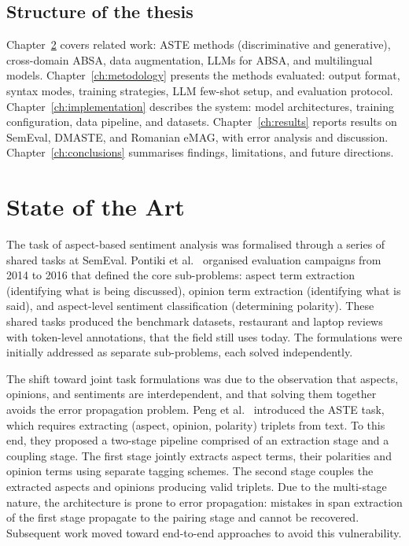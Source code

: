 \documentclass[12pt,a4paper]{report}
\begin{document}
\section{Structure of the thesis}

Chapter~\ref{ch:stateoftheart} covers related work: ASTE methods (discriminative and generative), cross-domain ABSA, data augmentation, LLMs for ABSA, and multilingual models. Chapter~\ref{ch:metodology} presents the methods evaluated: output format, syntax modes, training strategies, LLM few-shot setup, and evaluation protocol. Chapter~\ref{ch:implementation} describes the system: model architectures, training configuration, data pipeline, and datasets. Chapter~\ref{ch:results} reports results on SemEval, DMASTE, and Romanian eMAG, with error analysis and discussion. Chapter~\ref{ch:conclusions} summarises findings, limitations, and future directions.



\chapter{State of the Art}\label{ch:stateoftheart}

The task of aspect-based sentiment analysis was formalised through a series of shared tasks at SemEval. Pontiki et al.~\cite{pontiki2014semeval, pontiki2015semeval, pontiki2016semeval} organised evaluation campaigns from 2014 to 2016 that defined the core sub-problems: aspect term extraction (identifying what is being discussed), opinion term extraction (identifying what is said), and aspect-level sentiment classification (determining polarity). These shared tasks produced the benchmark datasets, restaurant and laptop reviews with token-level annotations, that the field still uses today. The formulations were initially addressed as separate sub-problems, each solved independently.

The shift toward joint task formulations was due to the observation that aspects, opinions, and sentiments are interdependent, and that solving them together avoids the error propagation problem. Peng et al.~\cite{peng2020knowing} introduced the ASTE task, which requires extracting (aspect, opinion, polarity) triplets from text. To this end, they proposed a two-stage pipeline comprised of an extraction stage and a coupling stage. The first stage jointly extracts aspect terms, their polarities and opinion terms using separate tagging schemes. The second stage couples the extracted aspects and opinions producing valid triplets. Due to the multi-stage nature, the architecture is prone to error propagation: mistakes in span extraction of the first stage propagate to the pairing stage and cannot be recovered. Subsequent work moved toward end-to-end approaches to avoid this vulnerability.
\end{document}
